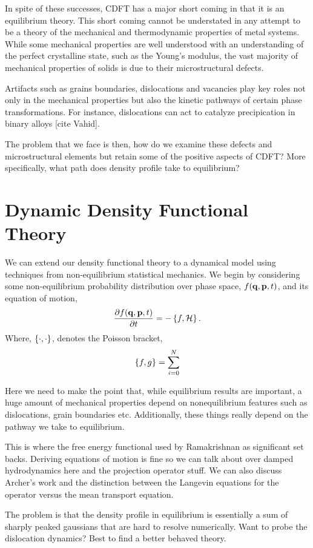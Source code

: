 In spite of these successes, CDFT has a major short coming in that it is an
equilibrium theory. This short coming cannot be understated in any attempt to
be a theory of the mechanical and thermodynamic properties of metal systems.
While some mechanical properties are well understood with an understanding of
the perfect crystalline state, such as the Young's modulus, the vast majority
of mechanical properties of solids is due to their microstructural defects.

Artifacts such as grains boundaries, dislocations and vacancies play key roles
not only in the mechanical properties but also the kinetic pathways of certain
phase transformations. For instance, dislocations can act to catalyze
precipication in binary alloys [cite Vahid].

The problem that we face is then, how do we examine these defects and
microstructural elements but retain some of the positive aspects of CDFT? More
specifically, what path does density profile take to equilibrium?

\section{Dynamic Density Functional Theory} %

We can extend our density functional theory to a dynamical model using
techniques from non-equilibrium statistical mechanics. We begin by considering
some non-equilibrium probability distribution over phase space, $f(\mathbf{q}, \mathbf{p}, t)$,
and its equation of motion,
%
\begin{equation}
    \label{liouville}
    \frac{\partial f(\mathbf{q}, \mathbf{p}, t)}{\partial t} = -\left\lbrace f, \mathcal{H} \right\rbrace.
\end{equation}
%
Where, $\left\lbrace \cdot, \cdot \right\rbrace$, denotes the Poisson bracket,
%
\begin{equation}
    \left\lbrace f, g \right\rbrace = \sum_{i = 0}^N
\end{equation}

{\color{ForestGreen} { \bfseries
    
    
    Here we need to make the point that, while equilibrium results are
    important, a huge amount of mechanical properties depend on
    nonequilibrium features such as dislocations, grain boundaries etc.
    Additionally, these things really depend on the pathway we take to
    equilibrium. 

    This is where the free energy functional used by Ramakrishnan as
    significant set backs. Deriving equations of motion is fine so we can
    talk about over damped hydrodynamics here and the projection operator
    stuff. We can also discuss Archer's work and the distinction between
    the Langevin equations for the operator versus the mean transport
    equation.

    The problem is that the density profile in equilibrium is essentially
    a sum of sharply peaked gaussians that are hard to resolve
    numerically. Want to probe the dislocation dynamics? Best to find a
    better behaved theory.} }

